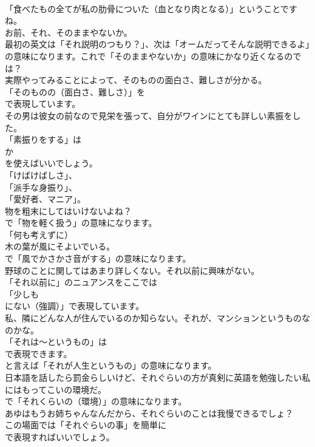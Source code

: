 \documentclass[8pt]{extreport}
\begin{document}
\begin{CJK}{UTF8}{min}
\\	「食べたもの全てが私の肋骨についた（血となり肉となる）」ということですね。	
\\	お前、それ、そのままやないか。 
\\	最初の英文は「それ説明のつもり？」、次は「オームだってそんな説明できるよ」の意味になります。これで「そのままやないか」の意味にかなり近くなるのでは？	
\\	実際やってみることによって、そのものの面白さ、難しさが分かる。 
\\	「そのものの（面白さ、難しさ）」を
\\	で表現しています。	
\\	その男は彼女の前なので見栄を張って、自分がワインにとても詳しい素振をした。 
\\	「素振りをする」は
\\	か
\\	を使えばいいでしょう。
\\	「けばけばしさ」、
\\	「派手な身振り」、
\\	「愛好者、マニア」。	
\\	物を粗末にしてはいけないよね？ 
\\	で「物を軽く扱う」の意味になります。
\\	「何も考えずに）	
\\	木の葉が風にそよいでいる。 
\\	で「風でかさかさ音がする」の意味になります。	
\\	野球のことに関してはあまり詳しくない。それ以前に興味がない。 
\\	「それ以前に」のニュアンスをここでは
\\	「少しも 
\\	にない（強調）」で表現しています。	
\\	私、隣にどんな人が住んでいるのか知らない。それが、マンションというものなのかな。 
\\	「それは～というもの」は
\\	で表現できます。
\\	と言えば「それが人生というもの」の意味になります。	
\\	日本語を話したら罰金らしいけど、それぐらいの方が真剣に英語を勉強したい私にはもってこいの環境だ。 
\\	で「それくらいの（環境）」の意味になります。	
\\	あゆはもうお姉ちゃんなんだから、それぐらいのことは我慢できるでしょ？ 
\\	この場面では「それぐらいの事」を簡単に
\\	で表現すればいいでしょう。	

\end{CJK}
\end{document}

